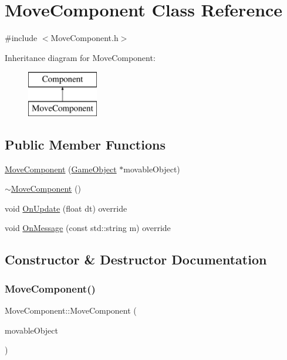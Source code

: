\hypertarget{class_move_component}{}\section{Move\+Component Class Reference}
\label{class_move_component}


{\ttfamily \#include $<$Move\+Component.\+h$>$}

Inheritance diagram for Move\+Component\+:\begin{figure}[H]
\begin{center}
\leavevmode
\includegraphics[height=2.000000cm]{class_move_component}
\end{center}
\end{figure}
\subsection*{Public Member Functions}
\begin{DoxyCompactItemize}
\item 
\mbox{\hyperlink{class_move_component_aee1693ed79d7d930e87ef35e40bbfcfa}{Move\+Component}} (\mbox{\hyperlink{class_game_object}{Game\+Object}} $\ast$movable\+Object)
\item 
\mbox{\hyperlink{class_move_component_a5e8430c851f1d83f2b8222c3c4ec097d}{$\sim$\+Move\+Component}} ()
\item 
void \mbox{\hyperlink{class_move_component_aac8549ecd0670b2b8830d43019d58ea4}{On\+Update}} (float dt) override
\item 
void \mbox{\hyperlink{class_move_component_a27146b88beda6223ed9f4a82c47a917a}{On\+Message}} (const std\+::string m) override
\end{DoxyCompactItemize}


\subsection{Constructor \& Destructor Documentation}
\mbox{\label{class_move_component_aee1693ed79d7d930e87ef35e40bbfcfa}} 
\subsubsection{\texorpdfstring{Move\+Component()}{MoveComponent()}}
{\footnotesize\ttfamily Move\+Component\+::\+Move\+Component (\begin{DoxyParamCaption}\item[{\mbox{\hyperlink{class_game_object}{Game\+Object}} $\ast$}]{movable\+Object }\end{DoxyParamCaption})\hspace{0.3cm}{\ttfamily [inline]}}

